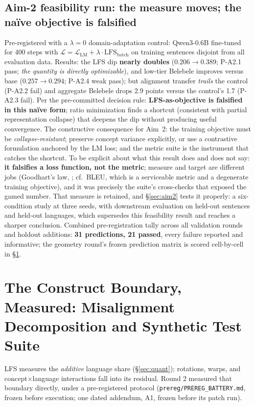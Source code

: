 \documentclass[11pt,a4paper]{article}
\begin{document}
\subsection*{Aim-2 feasibility run: the measure moves; the na\"ive objective
is falsified}
Pre-registered with a $\lambda{=}0$ domain-adaptation control: Qwen3-0.6B
fine-tuned for 400 steps with $\mathcal{L} = \mathcal{L}_{\mathrm{LM}} +
\lambda \cdot \mathrm{LFS}_{\mathrm{batch}}$ on training sentences disjoint
from all evaluation data. Results: the LFS dip \textbf{nearly doubles}
($0.206 \to 0.389$; P-A2.1 pass; \emph{the quantity is directly
optimizable}), and
low-tier Belebele improves versus base ($0.257 \to 0.294$; P-A2.4 weak
pass); but alignment transfer \emph{trails} the control (P-A2.2 fail) and
aggregate Belebele drops 2.9 points versus the control's 1.7 (P-A2.3 fail).
Per the pre-committed decision rule: \textbf{LFS-as-objective is falsified
in this na\"ive form}; ratio minimization finds a shortcut (consistent
with partial representation collapse) that deepens the dip without producing
useful convergence. The constructive consequence for Aim~2: the training
objective must be \emph{collapse-resistant}; preserve concept variance
explicitly, or use a contrastive formulation anchored by the LM loss; and the metric suite is the instrument that catches the shortcut.
To be explicit about what this result does and does not say: \textbf{it
falsifies a loss function, not the metric}; measure and target are
different jobs (Goodhart's law, \citealp{goodhart1975,strathern1997}; cf.\ BLEU, which is a serviceable metric and
a degenerate training objective), and it was precisely the suite's
cross-checks that exposed the gamed number. That measure is retained, and
\S\ref{sec:aim2} tests it properly: a six-condition study at three seeds, with
downstream evaluation on held-out sentences and held-out languages, which
supersedes this feasibility result and reaches a sharper conclusion. Combined pre-registration tally
across all validation rounds and holdout additions: \textbf{31 predictions,
21 passed}, every failure reported and informative; the geometry round's
frozen prediction matrix is scored cell-by-cell in \S\ref{sec:boundary}.

\section{The Construct Boundary, Measured: Misalignment Decomposition and
Synthetic Test Suite}
\label{sec:boundary}
LFS measures the \emph{additive} language share (\S\ref{sec:quant}); rotations,
warps, and concept$\times$language interactions fall into its residual. Round
2 measured that boundary directly, under a pre-registered protocol
(\texttt{prereg/PREREG\_BATTERY.md}, frozen before execution; one dated
addendum, A1, frozen before its patch run).
\end{document}
